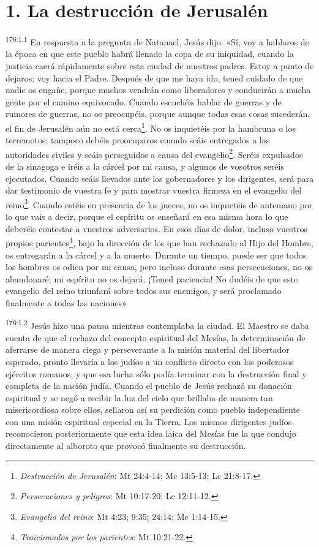 \section*{1. La destrucción de Jerusalén}
\par 
\textsuperscript{176:1.1} En respuesta a la pregunta de Natanael, Jesús dijo: «Sí, voy a hablaros de la época en que este pueblo habrá llenado la copa de su iniquidad, cuando la justicia caerá rápidamente sobre esta ciudad de nuestros padres. Estoy a punto de dejaros; voy hacia el Padre. Después de que me haya ido, tened cuidado de que nadie os engañe, porque muchos vendrán como liberadores y conducirán a mucha gente por el camino equivocado. Cuando escuchéis hablar de guerras y de rumores de guerras, no os preocupéis, porque aunque todas esas cosas sucederán, el fin de Jerusalén aún no está cerca\footnote{\textit{Destrucción de Jerusalén}: Mt 24:4-14; Mc 13:5-13; Lc 21:8-17.}. No os inquietéis por la hambruna o los terremotos; tampoco debéis preocuparos cuando seáis entregados a las autoridades civiles y seáis perseguidos a causa del evangelio\footnote{\textit{Persecuciones y peligros}: Mt 10:17-20; Lc 12:11-12.}. Seréis expulsados de la sinagoga e iréis a la cárcel por mi causa, y algunos de vosotros seréis ejecutados. Cuando seáis llevados ante los gobernadores y los dirigentes, será para dar testimonio de vuestra fe y para mostrar vuestra firmeza en el evangelio del reino\footnote{\textit{Evangelio del reino}: Mt 4:23; 9:35; 24:14; Mc 1:14-15.}. Cuando estéis en presencia de los jueces, no os inquietéis de antemano por lo que vais a decir, porque el espíritu os enseñará en esa misma hora lo que deberéis contestar a vuestros adversarios. En esos días de dolor, incluso vuestros propios parientes\footnote{\textit{Traicionados por los parientes}: Mt 10:21-22.}, bajo la dirección de los que han rechazado al Hijo del Hombre, os entregarán a la cárcel y a la muerte. Durante un tiempo, puede ser que todos los hombres os odien por mi causa, pero incluso durante esas persecuciones, no os abandonaré; mi espíritu no os dejará. ¡Tened paciencia! No dudéis de que este evangelio del reino triunfará sobre todos sus enemigos, y será proclamado finalmente a todas las naciones».

\par 
\textsuperscript{176:1.2} Jesús hizo una pausa mientras contemplaba la ciudad. El Maestro se daba cuenta de que el rechazo del concepto espiritual del Mesías, la determinación de aferrarse de manera ciega y perseverante a la misión material del libertador esperado, pronto llevaría a los judíos a un conflicto directo con los poderosos ejércitos romanos, y que esa lucha sólo podía terminar con la destrucción final y completa de la nación judía. Cuando el pueblo de Jesús rechazó su donación espiritual y se negó a recibir la luz del cielo que brillaba de manera tan misericordiosa sobre ellos, sellaron así su perdición como pueblo independiente con una misión espiritual especial en la Tierra. Los mismos dirigentes judíos reconocieron posteriormente que esta idea laica del Mesías fue la que condujo directamente al alboroto que provocó finalmente su destrucción.

